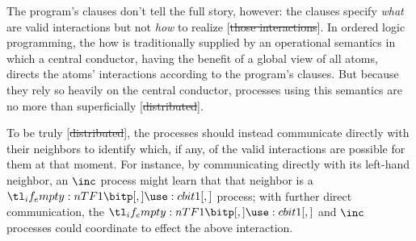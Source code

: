 \documentclass[
  class=../hdeyoung-proposal,
  crop=false
]{standalone}
\begin{document}
The program's clauses don't tell the full story, however:
the clauses specify \emph{what} are valid interactions but not \emph{how} to realize [\st{those interactions}].
In ordered logic programming, the how is traditionally supplied by an operational semantics in which a central conductor, having the benefit of a global view of all atoms, directs the atoms' interactions according to the program's clauses.
But because they rely so heavily on the central conductor, processes using this semantics are no more than superficially [\st{distributed}].


To be truly [\st{distributed}], the processes should instead communicate directly with their neighbors to identify which, if any, of the valid interactions are possible for them at that moment.
For instance, by communicating directly with its left-hand neighbor, an $\inc$ process might learn that that neighbor is a $\bit{1}$ process; with further direct communication, the $\bit{1}$ and $\inc$ processes could coordinate to effect the above interaction.
\end{document}
